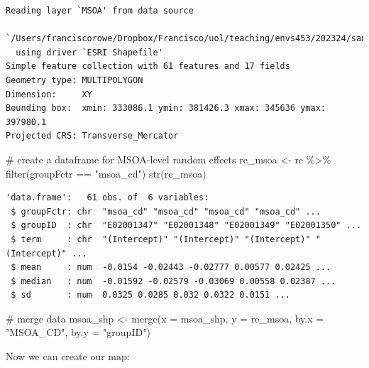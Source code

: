 \documentclass[
  letterpaper,
  DIV=11,
  numbers=noendperiod,
  oneside]{scrreprt}
\newenvironment{Shaded}{\begin{snugshade}}{\end{snugshade}}
\newcommand{\AttributeTok}[1]{\textcolor[rgb]{0.40,0.45,0.13}{#1}}
\newcommand{\CommentTok}[1]{\textcolor[rgb]{0.37,0.37,0.37}{#1}}
\newcommand{\FunctionTok}[1]{\textcolor[rgb]{0.28,0.35,0.67}{#1}}
\newcommand{\NormalTok}[1]{\textcolor[rgb]{0.00,0.23,0.31}{#1}}
\newcommand{\OtherTok}[1]{\textcolor[rgb]{0.00,0.23,0.31}{#1}}
\newcommand{\SpecialCharTok}[1]{\textcolor[rgb]{0.37,0.37,0.37}{#1}}
\newcommand{\StringTok}[1]{\textcolor[rgb]{0.13,0.47,0.30}{#1}}
\begin{document}
\begin{verbatim}
Reading layer `MSOA' from data source 
  `/Users/franciscorowe/Dropbox/Francisco/uol/teaching/envs453/202324/san/data/mlm/MSOA.shp' 
  using driver `ESRI Shapefile'
Simple feature collection with 61 features and 17 fields
Geometry type: MULTIPOLYGON
Dimension:     XY
Bounding box:  xmin: 333086.1 ymin: 381426.3 xmax: 345636 ymax: 397980.1
Projected CRS: Transverse_Mercator
\end{verbatim}

\begin{Shaded}
\begin{Highlighting}[]
\CommentTok{\# create a dataframe for MSOA{-}level random effects}
\NormalTok{re\_msoa }\OtherTok{\textless{}{-}}\NormalTok{ re }\SpecialCharTok{\%\textgreater{}\%} \FunctionTok{filter}\NormalTok{(groupFctr }\SpecialCharTok{==} \StringTok{"msoa\_cd"}\NormalTok{)}
\FunctionTok{str}\NormalTok{(re\_msoa)}
\end{Highlighting}
\end{Shaded}

\begin{verbatim}
'data.frame':   61 obs. of  6 variables:
 $ groupFctr: chr  "msoa_cd" "msoa_cd" "msoa_cd" "msoa_cd" ...
 $ groupID  : chr  "E02001347" "E02001348" "E02001349" "E02001350" ...
 $ term     : chr  "(Intercept)" "(Intercept)" "(Intercept)" "(Intercept)" ...
 $ mean     : num  -0.0154 -0.02443 -0.02777 0.00577 0.02425 ...
 $ median   : num  -0.01592 -0.02579 -0.03069 0.00558 0.02387 ...
 $ sd       : num  0.0325 0.0285 0.032 0.0322 0.0151 ...
\end{verbatim}

\begin{Shaded}
\begin{Highlighting}[]
\CommentTok{\# merge data}
\NormalTok{msoa\_shp }\OtherTok{\textless{}{-}} \FunctionTok{merge}\NormalTok{(}\AttributeTok{x =}\NormalTok{ msoa\_shp, }\AttributeTok{y =}\NormalTok{ re\_msoa, }\AttributeTok{by.x =} \StringTok{"MSOA\_CD"}\NormalTok{, }\AttributeTok{by.y =} \StringTok{"groupID"}\NormalTok{)}
\end{Highlighting}
\end{Shaded}

Now we can create our map:
\end{document}
